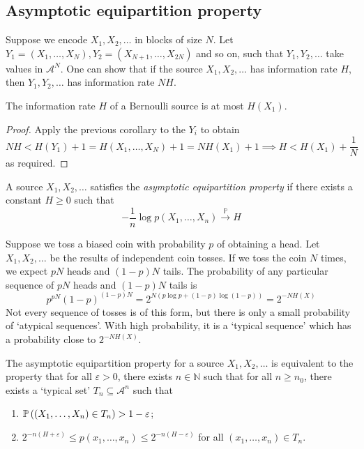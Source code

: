 \subsection{Asymptotic equipartition property}
Suppose we encode \( X_1, X_2, \dots \) in blocks of size \( N \).
Let \( Y_1 = (X_1, \dots, X_N), Y_2 = (X_{N+1}, \dots, X_{2N}) \) and so on, such that \( Y_1, Y_2, \dots \) take values in \( \mathcal A^N \).
One can show that if the source \( X_1, X_2, \dots \) has information rate \( H \), then \( Y_1, Y_2, \dots \) has information rate \( NH \).
\begin{proposition}
    The information rate \( H \) of a Bernoulli source is at most \( H(X_1) \).
\end{proposition}
\begin{proof}
    Apply the previous corollary to the \( Y_i \) to obtain
    \[ NH < H(Y_1) + 1 = H(X_1, \dots, X_N) + 1 = NH(X_1) + 1 \implies H < H(X_1) + \frac{1}{N} \]
    as required.
\end{proof}
\begin{definition}
    A source \( X_1, X_2, \dots \) satisfies the \emph{asymptotic equipartition property} if there exists a constant \( H \geq 0 \) such that
    \[ -\frac{1}{n} \log p(X_1, \dots, X_n) \xrightarrow{\mathbb P} H \]
\end{definition}
\begin{example}
    Suppose we toss a biased coin with probability \( p \) of obtaining a head.
    Let \( X_1, X_2, \dots \) be the results of independent coin tosses.
    If we toss the coin \( N \) times, we expect \( pN \) heads and \( (1-p)N \) tails.
    The probability of any particular sequence of \( pN \) heads and \( (1-p)N \) tails is
    \[ p^{pN} (1-p)^{(1-p)N} = 2^{N (p \log p + (1-p) \log(1-p))} = 2^{-NH(X)} \]
    Not every sequence of tosses is of this form, but there is only a small probability of `atypical sequences'.
    With high probability, it is a `typical sequence' which has a probability close to \( 2^{-NH(X)} \).
\end{example}
\begin{lemma}
    The asymptotic equipartition property for a source \( X_1, X_2, \dots \) is equivalent to the property that for all \( \varepsilon > 0 \), there exists \( n \in \mathbb N \) such that for all \( n \geq n_0 \), there exists a `typical set' \( T_n \subseteq \mathcal A^n \) such that
    \begin{enumerate}
        \item \( \mathbb{P}\left({(X_1, \dots, X_n) \in T_n}\right) > 1 - \varepsilon \);
        \item \( 2^{-n(H+\varepsilon)} \leq p(x_1, \dots, x_n) \leq 2^{-n(H-\varepsilon)} \) for all \( (x_1, \dots, x_n) \in T_n \).
    \end{enumerate}
\end{lemma}
